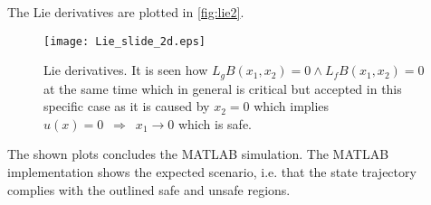 The Lie derivatives are plotted in \autoref{fig:lie2}.
\begin{figure}[H]
	\center
		\texttt{[image: Lie\_slide\_2d.eps]}
	\caption{Lie derivatives. It is seen how $L_gB(x_1,x_2) = 0 \wedge L_fB(x_1,x_2) = 0$ at the same time which in general is critical but accepted in this specific case as it is caused by $x_2=0$ which implies $u(x)=0 \,\,\, \Rightarrow \,\,\, x_1 \rightarrow 0$ which is safe.}
	\label{fig:lie2}
\end{figure}

The shown plots concludes the MATLAB simulation. The MATLAB implementation shows the expected scenario, i.e. that the state trajectory complies with the outlined safe and unsafe regions.
